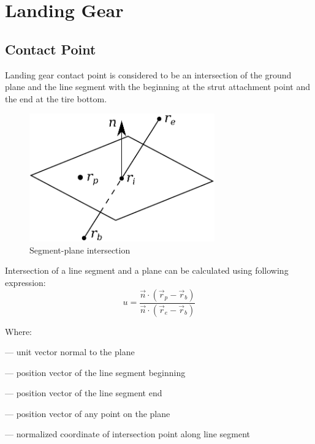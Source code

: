 \chapter{Landing Gear}

\section{Contact Point}

Landing gear contact point is considered to be an intersection of the ground plane and the line segment with the beginning at the strut attachment point and the end at the tire bottom.

\begin{figure}
  \centering
  \includegraphics[width=80mm]{eps/segment_plane_intersection.eps}
  \caption{Segment-plane intersection}
\end{figure}

Intersection of a line segment and a plane can be calculated using following expression: \cite{ORourke1998}
\begin{equation}
  \label{eq-lg-intersection}
  u =
  \frac
  { \vec n \cdot \left( {\vec r}_p - {\vec r}_b \right) }
  { \vec n \cdot \left( {\vec r}_e - {\vec r}_b \right) }
\end{equation}

Where:
\begin{description}[align=right,labelwidth=1cm]
  \item [$\vec n$]     --- unit vector normal to the plane
  \item [${\vec r}_b$] --- position vector of the line segment beginning
  \item [${\vec r}_e$] --- position vector of the line segment end
  \item [${\vec p}_b$] --- position vector of any point on the plane
  \item [$u$]          --- normalized coordinate of intersection point along line segment
\end{description}

